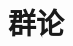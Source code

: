 \documentclass{book}
\newcommand{\setchapterintro}[1]{\setpartintro{#1}}
\newcommand{\setchapterimage}[1]{\setpartimage{#1}}
\begin{document}
\part{群论}
 
% 
 
% 
% 
% 
% 	
% 
% 
% 
% 
% 
% 
\end{document}
